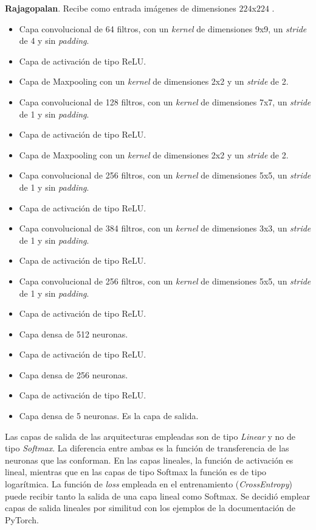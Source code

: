 \textbf{Rajagopalan}. Recibe como entrada imágenes de dimensiones $224$x$224$ \cite{CNNarch:Rajagopalan}.
\begin{itemize}
    \item Capa convolucional de 64 filtros, con un \textit{kernel} de dimensiones 9x9, un \textit{stride} de 4 y sin \textit{padding}.
    \item Capa de activación de tipo ReLU.
    \item Capa de Maxpooling con un \textit{kernel} de dimensiones 2x2 y un \textit{stride} de 2.
    \item Capa convolucional de 128 filtros, con un \textit{kernel} de dimensiones 7x7, un \textit{stride} de 1 y sin \textit{padding}.
    \item Capa de activación de tipo ReLU.
    \item Capa de Maxpooling con un \textit{kernel} de dimensiones 2x2 y un \textit{stride} de 2.
    \item Capa convolucional de 256 filtros, con un \textit{kernel} de dimensiones 5x5, un \textit{stride} de 1 y sin \textit{padding}.
    \item Capa de activación de tipo ReLU.
    \item Capa convolucional de 384 filtros, con un \textit{kernel} de dimensiones 3x3, un \textit{stride} de 1 y sin \textit{padding}.
    \item Capa de activación de tipo ReLU.
    \item Capa convolucional de 256 filtros, con un \textit{kernel} de dimensiones 5x5, un \textit{stride} de 1 y sin \textit{padding}.
    \item Capa de activación de tipo ReLU.
    \item Capa densa de 512 neuronas.
    \item Capa de activación de tipo ReLU.
    \item Capa densa de 256 neuronas.
    \item Capa de activación de tipo ReLU.
    \item Capa densa de 5 neuronas. Es la capa de salida.
\end{itemize}

Las capas de salida de las arquitecturas empleadas son de tipo \textit{Linear} y no de tipo \textit{Softmax}. La diferencia entre ambas es la función de transferencia de las neuronas que las conforman. En las capas lineales, la función de activación es lineal, mientras que en las capas de tipo Softmax la función es de tipo logarítmica. La función de \textit{loss} empleada en el entrenamiento (\textit{CrossEntropy}) puede recibir tanto la salida de una capa lineal como Softmax. Se decidió emplear capas de salida lineales por similitud con los ejemplos de la documentación de PyTorch.

